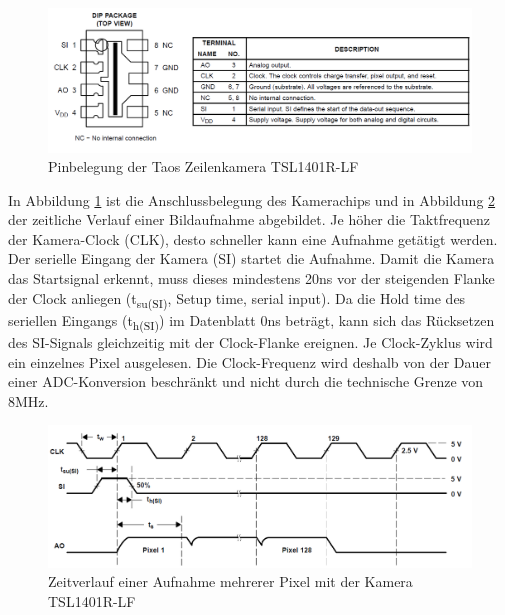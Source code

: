 \begin{figure}[H] %
\includegraphics[width=.90\textwidth]{sec7/images/CamPinning} 
\centering
\captionsetup{width=.95\textwidth}
\caption[PinbelegungTaos Zeilenkamera TSL1401R-LF ~\protect\cite{Taos}]{Pinbelegung der Taos Zeilenkamera TSL1401R-LF ~\protect\cite{Taos}}\centering
\label{fig:CamPinning}
\end{figure}

In Abbildung \ref{fig:CamPinning} ist die Anschlussbelegung des Kamerachips und in Abbildung \ref{fig:CamWaveform} der zeitliche Verlauf einer Bildaufnahme abgebildet. Je höher die Taktfrequenz der Kamera-Clock (CLK), desto schneller kann eine Aufnahme getätigt werden. Der serielle Eingang der Kamera (SI) startet die Aufnahme. Damit die Kamera das Startsignal erkennt, muss dieses mindestens 20ns vor der steigenden Flanke der Clock anliegen (t\textsubscript{su(SI)}, \glqq{}Setup time, serial input\grqq{}). Da die \glqq{}Hold time\grqq{} des seriellen Eingangs (t\textsubscript{h(SI)}) im Datenblatt 0ns beträgt, kann sich das Rücksetzen des SI-Signals gleichzeitig mit der Clock-Flanke ereignen. Je Clock-Zyklus wird ein einzelnes Pixel ausgelesen. Die Clock-Frequenz wird deshalb von der Dauer einer ADC-Konversion beschränkt und nicht durch die technische Grenze von 8MHz.

\begin{figure}[H] %
\includegraphics[width=.95\textwidth]{sec7/images/CamWaveform} 
\centering
\captionsetup{width=.95\textwidth}
\caption[Zeitverlauf einer Aufnahme mehrerer Pixel (TSL1401R-LF) ~\protect\cite{Taos}]{Zeitverlauf einer Aufnahme mehrerer Pixel mit der Kamera TSL1401R-LF ~\protect\cite{Taos}}\centering
\label{fig:CamWaveform}
\end{figure}


